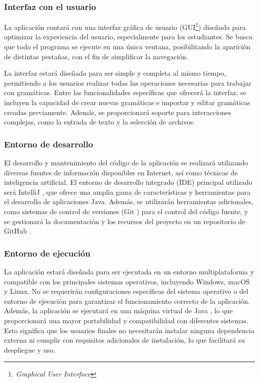 \subsubsection{Interfaz con el usuario}

La aplicación contará con una interfaz gráfica de usuario (GUI\footnote{\textit{Graphical User Interface}}) diseñada para optimizar la experiencia del usuario, especialmente para los estudiantes. Se busca que todo el programa se ejecute en una única ventana, posibilitando la aparición de distintas pestañas, con el fin de simplificar la navegación. 

La interfaz estará diseñada para ser simple y completa al mismo tiempo, permitiendo a los usuarios realizar todas las operaciones necesarias para trabajar con gramáticas. Entre las funcionalidades específicas que ofrecerá la interfaz, se incluyen la capacidad de crear nuevas gramáticas e importar y editar gramáticas creadas previamente. Además, se proporcionará soporte para interacciones complejas, como la entrada de texto y la selección de archivos.

\subsubsection{Entorno de desarrollo}
El desarrollo y mantenimiento del código de la aplicación se realizará utilizando diversas fuentes de información disponibles en Internet, así como técnicas de inteligencia artificial. El entorno de desarrollo integrado (IDE) principal utilizado será IntelliJ \cite{intellij}, que ofrece una amplia gama de características y herramientas para el desarrollo de aplicaciones Java. Además, se utilizarán herramientas adicionales, como sistemas de control de versiones (Git \cite{git}) para el control del código fuente, y se gestionará la documentación y los recursos del proyecto en un repositorio de GitHub \cite{github}.

\subsubsection{Entorno de ejecución}
La aplicación estará diseñada para ser ejecutada en un entorno multiplataforma y compatible con los principales sistemas operativos, incluyendo Windows, macOS y Linux. No se requerirán configuraciones específicas del sistema operativo o del entorno de ejecución para garantizar el funcionamiento correcto de la aplicación. Además, la aplicación se ejecutará en una máquina virtual de Java \cite{java}, lo que proporcionará una mayor portabilidad y compatibilidad con diferentes sistemas. Esto significa que los usuarios finales no necesitarán instalar ninguna dependencia externa ni cumplir con requisitos adicionales de instalación, lo que facilitará su despliegue y uso.


